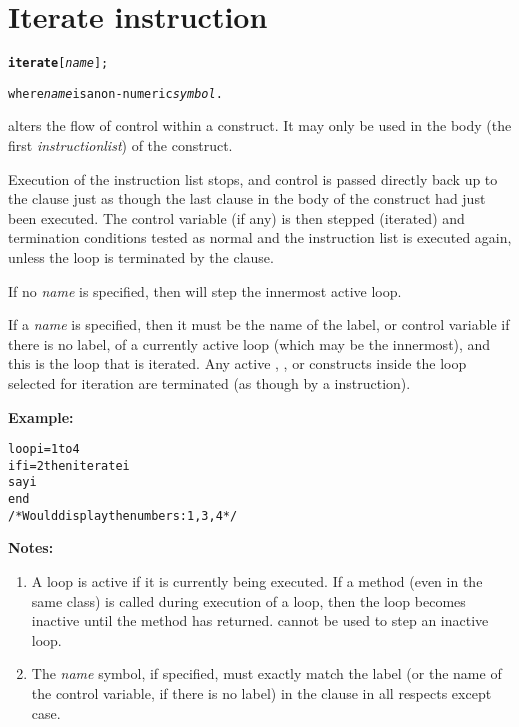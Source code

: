 \chapter{Iterate instruction}
\index{,}
\begin{shaded}
\begin{alltt}
\textbf{iterate} [\emph{name}];

where \emph{name} is a non-numeric \emph{symbol}.
\end{alltt}
\end{shaded}
  alters the flow of control within a 
construct.
It may only be used in the body (the first \emph{instructionlist})
of the construct.

Execution of the instruction list stops, and control is passed
directly back up to the  clause just as though the last
clause in the body of the construct had just been executed.
The control variable (if any) is then stepped (iterated) and termination
conditions tested as normal and the instruction list is executed again,
unless the loop is terminated by the  clause.

If no \emph{name} is specified, then  will step
the innermost active loop.
 
If a \emph{name} is specified, then it must be the name of the
label, or control variable if there is no label, of a currently active
loop (which may be the innermost), and this is the loop that is
iterated.
Any active , , or  constructs
inside the loop selected for iteration are terminated (as though by a
 instruction).

\textbf{Example:}
\begin{alltt}
loop i=1 to 4
  if i=2 then iterate i
  say i
  end
/* Would display the numbers:  1, 3, 4  */
\end{alltt}
 \textbf{Notes:}
\begin{enumerate}
\item A loop is active if it is currently being executed.
If a method (even in the same class) is called during execution of a
loop, then the loop becomes inactive until the method has returned.
 cannot be used to step an inactive loop.
\item The \emph{name} symbol, if specified, must exactly match the
label (or the name of the control variable, if there is no label) in the
 clause in all respects except case.
\end{enumerate}
